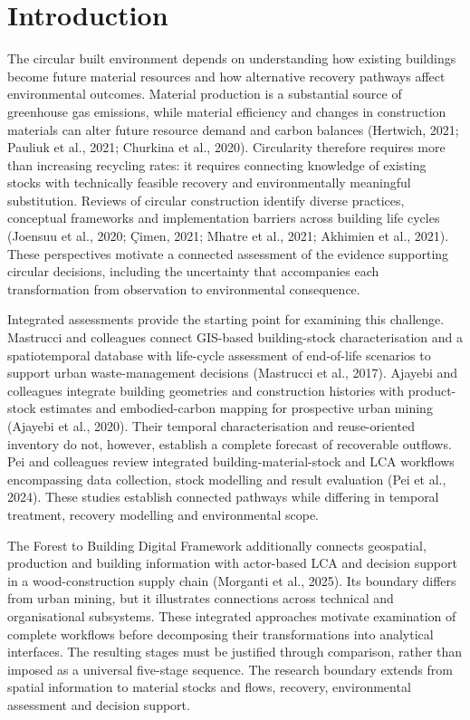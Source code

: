 
\section{Introduction}
The circular built environment depends on understanding how existing buildings become future material resources and how alternative recovery pathways affect environmental outcomes. Material production is a substantial source of greenhouse gas emissions, while material efficiency and changes in construction materials can alter future resource demand and carbon balances (Hertwich, 2021; Pauliuk et al., 2021; Churkina et al., 2020). Circularity therefore requires more than increasing recycling rates: it requires connecting knowledge of existing stocks with technically feasible recovery and environmentally meaningful substitution. Reviews of circular construction identify diverse practices, conceptual frameworks and implementation barriers across building life cycles (Joensuu et al., 2020; Çimen, 2021; Mhatre et al., 2021; Akhimien et al., 2021). These perspectives motivate a connected assessment of the evidence supporting circular decisions, including the uncertainty that accompanies each transformation from observation to environmental consequence.

Integrated assessments provide the starting point for examining this challenge. Mastrucci and colleagues connect GIS-based building-stock characterisation and a spatiotemporal database with life-cycle assessment of end-of-life scenarios to support urban waste-management decisions (Mastrucci et al., 2017). Ajayebi and colleagues integrate building geometries and construction histories with product-stock estimates and embodied-carbon mapping for prospective urban mining (Ajayebi et al., 2020). Their temporal characterisation and reuse-oriented inventory do not, however, establish a complete forecast of recoverable outflows. Pei and colleagues review integrated building-material-stock and LCA workflows encompassing data collection, stock modelling and result evaluation (Pei et al., 2024). These studies establish connected pathways while differing in temporal treatment, recovery modelling and environmental scope.

The Forest to Building Digital Framework additionally connects geospatial, production and building information with actor-based LCA and decision support in a wood-construction supply chain (Morganti et al., 2025). Its boundary differs from urban mining, but it illustrates connections across technical and organisational subsystems. These integrated approaches motivate examination of complete workflows before decomposing their transformations into analytical interfaces. The resulting stages must be justified through comparison, rather than imposed as a universal five-stage sequence. The research boundary extends from spatial information to material stocks and flows, recovery, environmental assessment and decision support.

